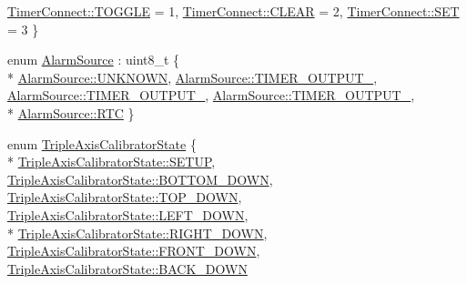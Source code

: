\begin{DoxyCompactItemize}
\hyperlink{namespaceflame_ae65577f52d5a5d4ce0cc5a4b85fb9ba9a1252c45651289c0b553a30d27bb5ae9b}{Timer\-Connect\-::\-T\-O\-G\-G\-L\-E} = 1, 
\hyperlink{namespaceflame_ae65577f52d5a5d4ce0cc5a4b85fb9ba9a813461e0c58e7ad59a2fd83ca2237fec}{Timer\-Connect\-::\-C\-L\-E\-A\-R} = 2, 
\hyperlink{namespaceflame_ae65577f52d5a5d4ce0cc5a4b85fb9ba9a8c52684db8f49511e9b44471716bf164}{Timer\-Connect\-::\-S\-E\-T} = 3
 \}
\item 
enum \hyperlink{namespaceflame_a6d176ba245556716fd3e32006bb7cfe5}{Alarm\-Source} \-: uint8\-\_\-t \{ \\*
\hyperlink{namespaceflame_a6d176ba245556716fd3e32006bb7cfe5a696b031073e74bf2cb98e5ef201d4aa3}{Alarm\-Source\-::\-U\-N\-K\-N\-O\-W\-N}, 
\hyperlink{namespaceflame_a6d176ba245556716fd3e32006bb7cfe5a8d203d2a2a904d6889ffa710d276285d}{Alarm\-Source\-::\-T\-I\-M\-E\-R\-\_\-\-O\-U\-T\-P\-U\-T\-\_}, 
\hyperlink{namespaceflame_a6d176ba245556716fd3e32006bb7cfe5a7eebc4b900fb380059fc2a75e6dd0c4d}{Alarm\-Source\-::\-T\-I\-M\-E\-R\-\_\-\-O\-U\-T\-P\-U\-T\-\_}, 
\hyperlink{namespaceflame_a6d176ba245556716fd3e32006bb7cfe5ac858ecba9866076c23a4841b1c2ba4b8}{Alarm\-Source\-::\-T\-I\-M\-E\-R\-\_\-\-O\-U\-T\-P\-U\-T\-\_}, 
\\*
\hyperlink{namespaceflame_a6d176ba245556716fd3e32006bb7cfe5a60d7c622c274b332962891475cb459fb}{Alarm\-Source\-::\-R\-T\-C}
 \}
\item 
enum \hyperlink{namespaceflame_a72abf3b66537683db272a18f7d34a5a7}{Triple\-Axis\-Calibrator\-State} \{ \\*
\hyperlink{namespaceflame_a72abf3b66537683db272a18f7d34a5a7addbb81a9e3aab6cfa19ad8eb2389efd4}{Triple\-Axis\-Calibrator\-State\-::\-S\-E\-T\-U\-P}, 
\hyperlink{namespaceflame_a72abf3b66537683db272a18f7d34a5a7ab19f17287d5bbd80bf5a93638c75ef7e}{Triple\-Axis\-Calibrator\-State\-::\-B\-O\-T\-T\-O\-M\-\_\-\-D\-O\-W\-N}, 
\hyperlink{namespaceflame_a72abf3b66537683db272a18f7d34a5a7ab55192dbb16394dbb68c7532b918b25b}{Triple\-Axis\-Calibrator\-State\-::\-T\-O\-P\-\_\-\-D\-O\-W\-N}, 
\hyperlink{namespaceflame_a72abf3b66537683db272a18f7d34a5a7a16a9066375b3b3aaa9c8eb4313411db2}{Triple\-Axis\-Calibrator\-State\-::\-L\-E\-F\-T\-\_\-\-D\-O\-W\-N}, 
\\*
\hyperlink{namespaceflame_a72abf3b66537683db272a18f7d34a5a7ad904e5818165807101f4603409bd15ab}{Triple\-Axis\-Calibrator\-State\-::\-R\-I\-G\-H\-T\-\_\-\-D\-O\-W\-N}, 
\hyperlink{namespaceflame_a72abf3b66537683db272a18f7d34a5a7ae32e2749418a0faabc94a30c3194152c}{Triple\-Axis\-Calibrator\-State\-::\-F\-R\-O\-N\-T\-\_\-\-D\-O\-W\-N}, 
\hyperlink{namespaceflame_a72abf3b66537683db272a18f7d34a5a7ae9ad86b49d8e7d97546d424e8257d683}{Triple\-Axis\-Calibrator\-State\-::\-B\-A\-C\-K\-\_\-\-D\-O\-W\-N}

\end{DoxyCompactItemize}
